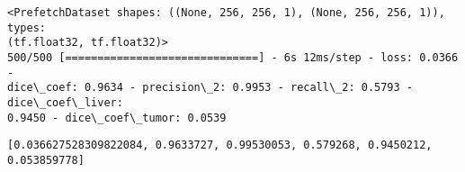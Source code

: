 \documentclass[11pt]{article}
\newcommand{\prompt}[4]{
        \llap{{\color{#2}[#3]: #4}}\vspace{-1.25em}
    }
\begin{document}
    \begin{Verbatim}[commandchars=\\\{\}]
<PrefetchDataset shapes: ((None, 256, 256, 1), (None, 256, 256, 1)), types:
(tf.float32, tf.float32)>
500/500 [==============================] - 6s 12ms/step - loss: 0.0366 -
dice\_coef: 0.9634 - precision\_2: 0.9953 - recall\_2: 0.5793 - dice\_coef\_liver:
0.9450 - dice\_coef\_tumor: 0.0539
\end{Verbatim}

            \begin{tcolorbox}[breakable, boxrule=.5pt, size=fbox, pad at break*=1mm, opacityfill=0]
\prompt{Out}{outcolor}{30}{\hspace{3.5pt}}
\begin{Verbatim}[commandchars=\\\{\}]
[0.036627528309822084, 0.9633727, 0.99530053, 0.579268, 0.9450212, 0.053859778]
\end{Verbatim}
\end{tcolorbox}
        
\end{document}
